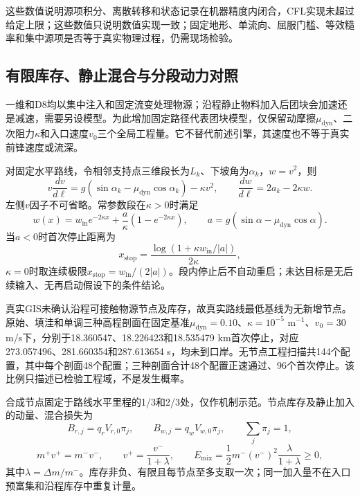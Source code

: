 这些数值说明源项积分、离散转移和状态记录在机器精度内闭合，CFL实现未超过给定上限；这些数值只说明数值实现一致；固定地形、单流向、屈服门槛、等效糙率和集中源项是否等于真实物理过程，仍需现场检验。

\subsection{有限库存、静止混合与分段动力对照}
一维和D8均以集中注入和固定流变处理物源；沿程静止物料加入后团块会加速还是减速，需要另设模型。为此增加固定路径代表团块模型，仅保留动摩擦$\mu_{\mathrm{dyn}}$、二次阻力$\kappa$和入口速度$v_0$三个全局工程量。它不替代前述引擎，其速度也不等于真实前锋速度或流深。

对固定水平路线，令相邻支持点三维段长为$L_k$、下坡角为$\alpha_k$，$w=v^2$，则
\begin{equation}
v\frac{dv}{d\ell}
=g(\sin\alpha_k-\mu_{\mathrm{dyn}}\cos\alpha_k)-\kappa v^2,
\qquad
\frac{dw}{d\ell}=2a_k-2\kappa w.
\end{equation}
左侧$v$因子不可省略。常参数段在$\kappa>0$时满足
\begin{equation}
w(x)=w_{\mathrm{in}}e^{-2\kappa x}
+\frac{a}{\kappa}(1-e^{-2\kappa x}),
\qquad
a=g(\sin\alpha-\mu_{\mathrm{dyn}}\cos\alpha).
\end{equation}
当$a<0$时首次停止距离为
\begin{equation}
x_{\mathrm{stop}}
=\frac{\log\left(1+\kappa w_{\mathrm{in}}/|a|\right)}{2\kappa},
\end{equation}
$\kappa=0$时取连续极限$x_{\mathrm{stop}}=w_{\mathrm{in}}/(2|a|)$。段内停止后不自动重启；未达目标是无后续输入、无再启动假设下的条件结论。

真实GIS未确认沿程可接触物源节点及库存，故真实路线最低基线为无新增节点。原始、填洼和单调三种高程剖面在固定基准$\mu_{\mathrm{dyn}}=0.10$、$\kappa=10^{-5}$ m$^{-1}$、$v_0=30$ m/s下，分别于18.360547、18.226423和18.535479 km首次停止，对应273.057496、281.660354和287.613654 s，均未到口岸。无节点工程扫描共144个配置，其中每个剖面48个配置；三种剖面合计48个配置正速通过、96个首次停止。该比例只描述已检验工程域，不是发生概率。

合成节点固定于路线水平里程的1/3和2/3处，仅作机制示范。节点库存及静止加入的动量、混合损失为
\begin{equation}
B_{r,j}=q_rV_{r,0}\pi_j,\qquad
B_{w,j}=q_wV_{w,0}\pi_j,\qquad
\sum_j\pi_j=1,
\end{equation}
\begin{equation}
m^+v^+=m^-v^-,\qquad
v^+=\frac{v^-}{1+\lambda},
\qquad
E_{\mathrm{mix}}
=\frac12m^-(v^-)^2\frac{\lambda}{1+\lambda}\ge0,
\end{equation}
其中$\lambda=\Delta m/m^-$。库存非负、有限且每节点至多支取一次；同一加入量不在入口预富集和沿程库存中重复计量。

